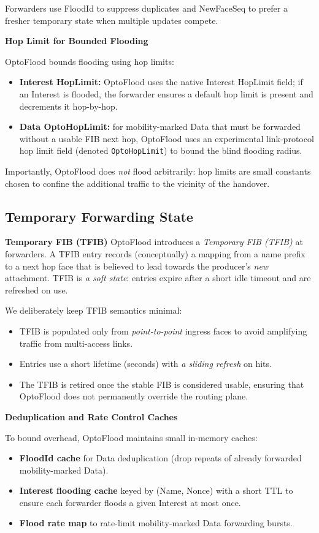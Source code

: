 Forwarders use FloodId to suppress duplicates and NewFaceSeq to prefer a fresher temporary state when multiple updates compete.

\textbf{Hop Limit for Bounded Flooding}

OptoFlood bounds flooding using hop limits:
\begin{itemize}
  \item \textbf{Interest HopLimit:} OptoFlood uses the native Interest HopLimit field; if an Interest is flooded, the forwarder ensures a default hop limit is present and decrements it hop-by-hop.
  \item \textbf{Data OptoHopLimit:} for mobility-marked Data that must be forwarded without a usable FIB next hop, OptoFlood uses an experimental link-protocol hop limit field (denoted \texttt{OptoHopLimit}) to bound the blind flooding radius.
\end{itemize}

Importantly, OptoFlood does \emph{not} flood arbitrarily: hop limits are small constants chosen to confine the additional traffic to the vicinity of the handover.

\subsection{Temporary Forwarding State}

\textbf{Temporary FIB (TFIB)}
OptoFlood introduces a \emph{Temporary FIB (TFIB)} at forwarders. A TFIB entry records (conceptually) a mapping from a name prefix to a next hop face that is believed to lead towards the producer's \emph{new} attachment.
TFIB is \emph{a soft state}: entries expire after a short idle timeout and are refreshed on use.

We deliberately keep TFIB semantics minimal:
\begin{itemize}
  \item TFIB is populated only from \emph{point-to-point} ingress faces to avoid amplifying traffic from multi-access links.
  \item Entries use a short lifetime (seconds) with \emph{a sliding refresh} on hits.
  \item The TFIB is retired once the stable FIB is considered usable, ensuring that OptoFlood does not permanently override the routing plane.
\end{itemize}

\textbf{Deduplication and Rate Control Caches}

To bound overhead, OptoFlood maintains small in-memory caches:
\begin{itemize}
  \item \textbf{FloodId cache} for Data deduplication (drop repeats of already forwarded mobility-marked Data).
  \item \textbf{Interest flooding cache} keyed by (Name, Nonce) with a short TTL to ensure each forwarder floods a given Interest at most once.
  \item \textbf{Flood rate map} to rate-limit mobility-marked Data forwarding bursts.
\end{itemize}

